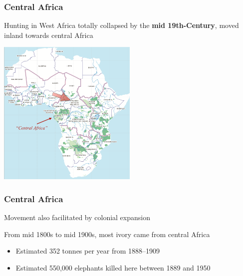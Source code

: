 \documentclass[10pt]{beamer}
\begin{document}
\begin{frame}[t]
\frametitle{Central Africa}
\vspace{0.5cm}
	
	Hunting in West Africa totally collapsed by the \textbf{mid 19th-Century}, moved inland towards central Africa	\\
	
	\medskip
	
	\begin{center}
		\includegraphics[width=0.5\textwidth]{figures/central1.png}\\
	\end{center}
\end{frame}


\begin{frame}[t]
\frametitle{Central Africa}
\vspace{0.5cm}
	
	Movement also facilitated by colonial expansion\\
	
	\bigskip
	
	From mid 1800s to mid 1900s, most ivory came from central Africa
		\medskip
		\begin{itemize}
			\item Estimated 352 tonnes per year from 1888--1909
			\medskip
			\item Estimated 550,000 elephants killed here between 1889 and 1950
		\end{itemize}
\end{frame}
\end{document}
